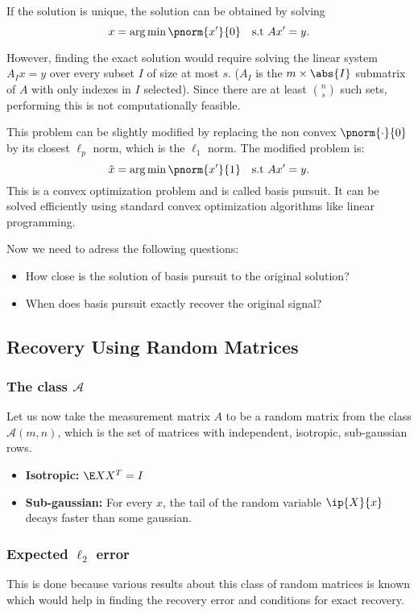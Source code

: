If the solution is unique, the solution can be obtained by solving
\[
	x = \arg\min \pnorm{x'}{0} \quad \text{s.t } Ax' = y.
\]

However, finding the exact solution 
would require solving the linear system
$A_I x = y$ over every subset $I$ of size at most $s$.
($A_I$ is the $m\times \abs{I}$ submatrix of $A$ with only
indexes in $I$ selected).
Since there are at least $\binom{n}{s}$ such sets, performing this
is not computationally feasible.

This problem can be slightly modified by replacing the
non convex $\pnorm{\cdot}{0}$ by its closest $\ell_p$ norm,
which is the $\ell_1$ norm. The modified problem is:
\[
	\hat{x} = \arg\min \pnorm{x'}{1}\quad \text{s.t } Ax' = y.
\]
This is a convex optimization problem and is called basis
pursuit. It can be solved efficiently using standard convex
optimization algorithms like linear programming.

Now we need to adress the following questions:
\begin{itemize}
	\item How close is the solution of basis pursuit to the
		original solution?
	
	\item When does basis pursuit exactly recover the original
		signal?
\end{itemize}

\subsection*{Recovery Using Random Matrices}
\subsubsection*{The class $\mathcal{A}$}
Let us now take the measurement matrix $A$ to be a random
matrix from the class $\mathcal{A}(m, n)$, which is the set
of matrices with independent, isotropic, sub-gaussian rows.
\begin{itemize}
		\item \textbf{Isotropic: } $\E XX^T = I$
		\item \textbf{Sub-gaussian: } For every $x$, the tail of the
			random variable $\ip{X}{x}$ decays faster than some gaussian.
\end{itemize}

\subsubsection*{Expected $\ell_2$ error}
This is done because various results about this class
of random matrices is known which would help in finding the
recovery error and conditions for exact recovery. 

